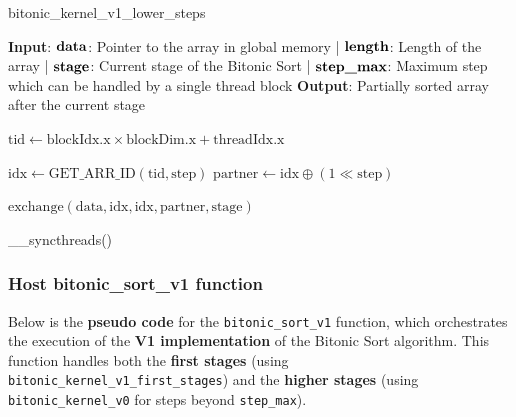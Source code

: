 \documentclass[12pt]{article}
\begin{document}
\begin{algorithm}[H]
\caption{bitonic\_kernel\_v1\_lower\_steps}\label{alg:v1_kernel}
\begin{algorithmic}[1]
\Require \textbf{Input}: 
    \( \text{\textbf{data}} \): Pointer to the array in global memory |  
    \( \text{\textbf{length}} \): Length of the array | 
    \( \text{\textbf{stage}} \): Current stage of the Bitonic Sort | 
    \( \text{\textbf{step\_max}} \): Maximum step which can be handled by a single thread block
\Ensure \textbf{Output}: Partially sorted array after the current stage

\State \( \text{tid} \gets \text{blockIdx.x} \times \text{blockDim.x} + \text{threadIdx.x} \) 
    \State \Return {}
\EndIf

    \State \( \text{idx} \gets \text{GET\_ARR\_ID}(\text{tid}, \text{step}) \) 
    \State \( \text{partner} \gets \text{idx} \oplus (1 \ll \text{step}) \) 
    
        \State \( \text{exchange}(\text{data}, \text{idx}, \text{idx}, \text{partner}, \text{stage}) \) 
    \EndIf
    
    \State \_\_syncthreads() 
\EndFor
\end{algorithmic}
\end{algorithm}

\subsubsection{Host bitonic\_sort\_v1 function}

Below is the \textbf{pseudo code} for the \texttt{bitonic\_sort\_v1} function, which orchestrates the execution of the \textbf{V1 implementation} of the Bitonic Sort algorithm. This function handles both the \textbf{first stages} (using \texttt{bitonic\_kernel\_v1\_first\_stages}) and the \textbf{higher stages} (using \texttt{bitonic\_kernel\_v0} for steps beyond \texttt{step\_max}).
\end{document}
